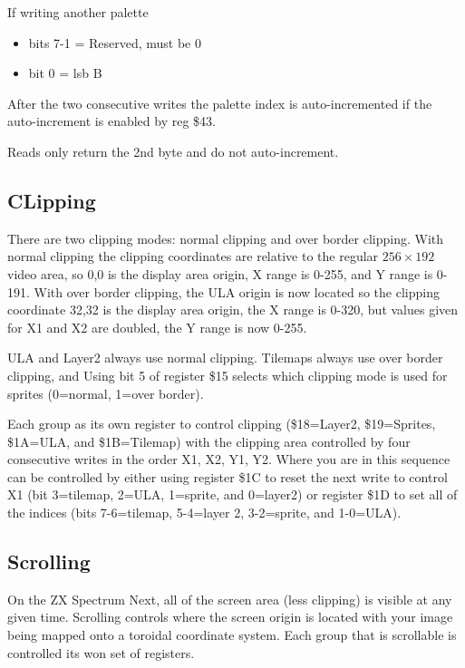 If writing another palette

\hrulefill
\begin{itemize}
\item bits 7-1 = Reserved, must be 0
\item bit 0 = lsb B
\end{itemize}           
After the two consecutive writes the palette index is auto-incremented
if the auto-increment is enabled by reg \$43.
     
Reads only return the 2nd byte and do not auto-increment.

\subsection{CLipping}

There are two clipping modes: normal clipping and over border
clipping. With normal clipping the clipping coordinates are relative
to the regular $256\times192$ video area, so 0,0 is the display area origin,
X range is 0-255, and Y range is 0-191. With over border clipping, the
ULA origin is now located so the clipping coordinate 32,32 is the
display area origin, the X range is 0-320, but values given for X1 and
X2 are doubled, the Y range is now 0-255.

ULA and Layer2 always use normal clipping.  Tilemaps always use over
border clipping, and Using bit 5 of register \$15 selects which
clipping mode is used for sprites (0=normal, 1=over border).

Each group as its own register to control clipping (\$18=Layer2,
\$19=Sprites, \$1A=ULA, and \$1B=Tilemap) with the clipping area
controlled by four consecutive writes in the order X1, X2, Y1,
Y2. Where you are in this sequence can be controlled by either using
register \$1C to reset the next write to control X1 (bit 3=tilemap,
2=ULA, 1=sprite, and 0=layer2) or register \$1D to set all of the
indices (bits 7-6=tilemap, 5-4=layer 2, 3-2=sprite, and 1-0=ULA).

\subsection{Scrolling}

On the ZX Spectrum Next, all of the screen area (less clipping) is
visible at any given time. Scrolling controls where the screen origin
is located with your image being mapped onto a toroidal coordinate
system. Each group that is scrollable is controlled its won set of
registers.

